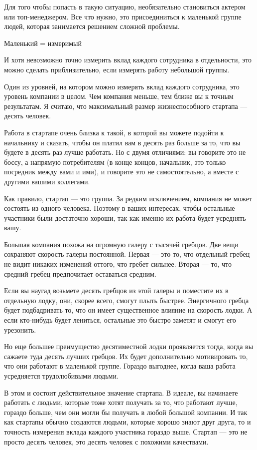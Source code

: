 \documentclass[ebook,12pt,oneside,openany]{memoir}
\begin{document}
Для того чтобы попасть в такую ситуацию, необязательно становиться
актером или топ-менеджером. Все что нужно, это присоединиться к
маленькой группе людей, которая занимается решением сложной проблемы.

Маленький = измеримый

И хотя невозможно точно измерить вклад каждого сотрудника в
отдельности, это можно сделать приблизительно, если измерять работу
небольшой группы.

Один из уровней, на котором можно измерять вклад каждого сотрудника,
это уровень компании в целом. Чем компания меньше, тем ближе вы к
точным результатам. Я считаю, что максимальный размер жизнеспособного
стартапа — десять человек.

Работа в стартапе очень близка к такой, в которой вы можете подойти к
начальнику и сказать, чтобы он платил вам в десять раз больше за то,
что вы будете в десять раз лучше работать. Но с двумя отличиями: вы
говорите это не боссу, а напрямую потребителям (в конце концов,
начальник, это только посредник между вами и ими), и говорите это не
самостоятельно, а вместе с другими вашими коллегами.

Как правило, стартап — это группа. За редким исключением, компания не
может состоять из одного человека. Поэтому в ваших интересах, чтобы
остальные участники были достаточно хороши, так как именно их работа
будет усреднять вашу.

Большая компания похожа на огромную галеру с тысячей гребцов. Две вещи
сохраняют скорость галеры постоянной. Первая — это то, что отдельный
гребец не видит никаких изменений оттого, что гребет сильнее. Вторая —
то, что средний гребец предпочитает оставаться средним.

Если вы наугад возьмете десять гребцов из этой галеры и поместите их в
отдельную лодку, они, скорее всего, смогут плыть быстрее. Энергичного
гребца будет подбадривать то, что он имеет существенное влияние на
скорость лодки. А если кто-нибудь будет лениться, остальные это быстро
заметят и смогут его урезонить.

Но еще большее преимущество десятиместной лодки проявляется тогда,
когда вы сажаете туда десять лучших гребцов. Их будет дополнительно
мотивировать то, что они работают в маленькой группе. Гораздо
выгоднее, когда ваша работа усредняется трудолюбивыми людьми.

В этом и состоит действительное значение стартапа. В идеале, вы
начинаете работать с людьми, которые тоже хотят получать за то, что
работают лучше, гораздо больше, чем они могли бы получать в любой
большой компании. И так как стартапы обычно создаются людьми, которые
хорошо знают друг друга, то и точность измерения вклада каждого
участника гораздо выше. Стартап — это не просто десять человек, это
десять человек с похожими качествами.
\end{document}
